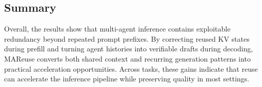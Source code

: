 \documentclass[letterpaper]{article} %
\begin{document}
\subsection{Summary}

Overall, the results show that multi-agent inference contains exploitable redundancy beyond repeated prompt prefixes. By correcting reused KV states during prefill and turning agent histories into verifiable drafts during decoding, MAReuse converts both shared context and recurring generation patterns into practical acceleration opportunities. Across tasks, these gains indicate that reuse can accelerate the inference pipeline while preserving quality in most settings.


\end{document}
